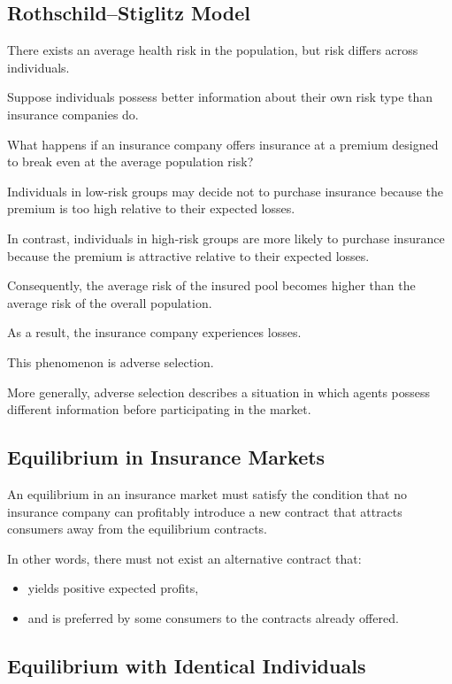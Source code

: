 \subsection{Rothschild--Stiglitz Model}

There exists an average health risk in the population, but risk differs across individuals.

Suppose individuals possess better information about their own risk type than insurance companies do.

What happens if an insurance company offers insurance at a premium designed to break even at the average population risk?

Individuals in low-risk groups may decide not to purchase insurance because the premium is too high relative to their expected losses.

In contrast, individuals in high-risk groups are more likely to purchase insurance because the premium is attractive relative to their expected losses.

Consequently, the average risk of the insured pool becomes higher than the average risk of the overall population.

As a result, the insurance company experiences losses.

This phenomenon is adverse selection.

More generally, adverse selection describes a situation in which agents possess different information before participating in the market.

\subsection{Equilibrium in Insurance Markets}

An equilibrium in an insurance market must satisfy the condition that no insurance company can profitably introduce a new contract that attracts consumers away from the equilibrium contracts.

In other words, there must not exist an alternative contract that:

\begin{itemize}
    \item yields positive expected profits,
    \item and is preferred by some consumers to the contracts already offered.
\end{itemize}

\subsection{Equilibrium with Identical Individuals}


